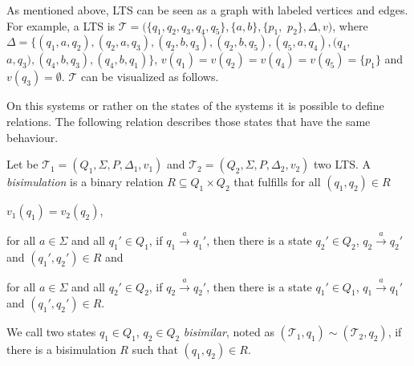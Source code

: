 \begin{example}
    \label{example:lts}
    As mentioned above, LTS can be seen as a graph with labeled vertices and edges. For example, a LTS is
    $\mathcal{T} = (\{q_1, q_2, q_3, q_4, q_5\}, \{a, b\}, \{p_1,$ $ p_2\}, \Delta, v)$, where $\Delta = \{(q_1, a,
q_2)
    , (q_2, a, q_3), (q_2, b, q_3), (q_2, b, q_5), (q_5, a, q_4), (q_4, $ $a, q_3), (q_4, b, q_3), (q_4, b, q_1)\}$,
    $v(q_1) = v(q_2) = v(q_4) = v(q_5) = \{p_1\}$ and $v(q_3) = \emptyset$. $\mathcal{T}$ can be visualized as
    follows.
\begin{center}
\end{center}
\end{example}

On this systems or rather on the states of the systems it is possible to define relations. The
following relation describes those states that have the same behaviour.

\begin{definition}
    Let be $\mathcal{T}_1 = (Q_1, \Sigma, P, \Delta_1, v_1)$ and $\mathcal{T}_2 = (Q_2, \Sigma, P, \Delta_2, v_2)
    $ two LTS. A \emph{bisimulation} is a binary relation $R \subseteq Q_1 \times Q_2$ that fulfills for all $(q_1,
    q_2) \in R$
    \begin{compactitem}
        \item $v_1 (q_1) = v_2 (q_2)$,
        \item for all $a \in \Sigma$ and all $q_1' \in Q_1$, if $q_1 \overset{a}{\rightarrow} q_1'$, then there
        is a state $q_2' \in Q_2$, $q_2 \overset{a}{\rightarrow} q_2'$ and $(q_1', q_2') \in R$ and
        \item for all $a \in \Sigma$ and all $q_2' \in Q_2$, if $q_2 \overset{a}{\rightarrow} q_2'$, then there is a
        state $q_1' \in Q_1$, $q_1 \overset{a}{\rightarrow} q_1'$ and $(q_1', q_2') \in R$.
    \end{compactitem}
    We call two states $q_1 \in Q_1$, $q_2 \in Q_2$ \emph{bisimilar}, noted as $(\mathcal{T}_1, q_1) \sim
    (\mathcal{T}_2, q_2)$, if there
    is a bisimulation $R$ such that $(q_1, q_2) \in R$.
\end{definition}

